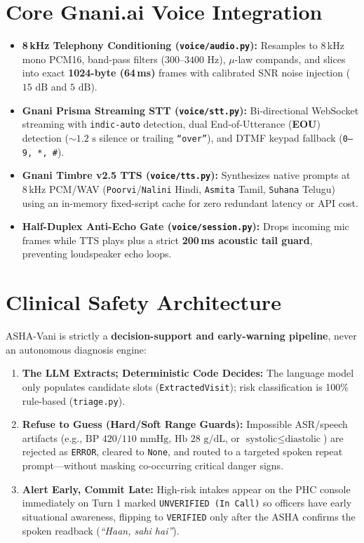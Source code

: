 \documentclass[9pt,a4paper,twocolumn]{article}
\begin{document}
\section{Core Gnani.ai Voice Integration}
\begin{itemize}
  \item \textbf{8\,kHz Telephony Conditioning (\texttt{voice/audio.py}):} Resamples to 8\,kHz mono PCM16, band-pass filters ($300\text{--}3400\text{ Hz}$), $\mu$-law compands, and slices into exact \textbf{1024-byte (64\,ms)} frames with calibrated SNR noise injection ($15\text{ dB}$ and $5\text{ dB}$).
  \item \textbf{Gnani Prisma Streaming STT (\texttt{voice/stt.py}):} Bi-directional WebSocket streaming with \texttt{indic-auto} detection, dual End-of-Utterance (\textbf{EOU}) detection ($\sim 1.2\text{ s}$ silence or trailing \texttt{``over''}), and DTMF keypad fallback (\texttt{0--9, *, \#}).
  \item \textbf{Gnani Timbre v2.5 TTS (\texttt{voice/tts.py}):} Synthesizes native prompts at 8\,kHz PCM/WAV (\texttt{Poorvi}/\texttt{Nalini} Hindi, \texttt{Asmita} Tamil, \texttt{Suhana} Telugu) using an in-memory fixed-script cache for zero redundant latency or API cost.
  \item \textbf{Half-Duplex Anti-Echo Gate (\texttt{voice/session.py}):} Drops incoming mic frames while TTS plays plus a strict \textbf{200\,ms acoustic tail guard}, preventing loudspeaker echo loops.
\end{itemize}

\section{Clinical Safety Architecture}
ASHA-Vani is strictly a \textbf{decision-support and early-warning pipeline}, never an autonomous diagnosis engine:
\begin{enumerate}[leftmargin=12pt,itemsep=1pt,topsep=1pt]
  \item \textbf{The LLM Extracts; Deterministic Code Decides:} The language model only populates candidate slots (\texttt{ExtractedVisit}); risk classification is 100\% rule-based (\texttt{triage.py}).
  \item \textbf{Refuse to Guess (Hard/Soft Range Guards):} Impossible ASR/speech artifacts (e.g., $\text{BP } 420/110\text{ mmHg}$, $\text{Hb } 28\text{ g/dL}$, or $\text{systolic} \le \text{diastolic}$) are rejected as \texttt{ERROR}, cleared to \texttt{None}, and routed to a targeted spoken repeat prompt—without masking co-occurring critical danger signs.
  \item \textbf{Alert Early, Commit Late:} High-risk intakes appear on the PHC console immediately on Turn 1 marked \texttt{UNVERIFIED (In Call)} so officers have early situational awareness, flipping to \texttt{VERIFIED} only after the ASHA confirms the spoken readback (\emph{``Haan, sahi hai''}).
\end{enumerate}
\end{document}
